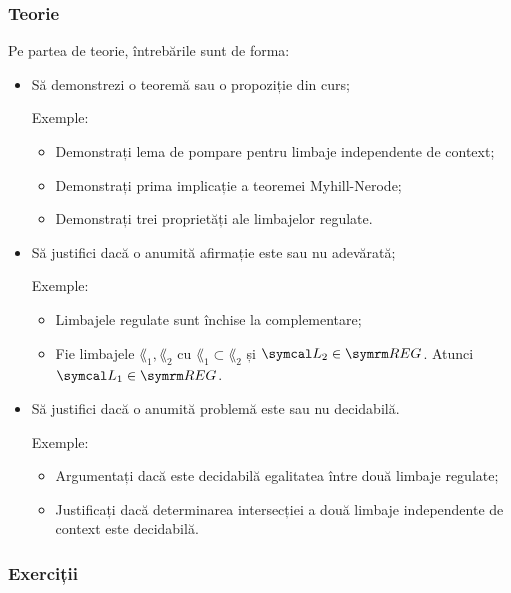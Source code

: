 \subsubsection*{Teorie}
Pe partea de teorie, întrebările sunt de forma:
\begin{itemize}
    \item Să demonstrezi o teoremă sau o propoziție din curs;

          Exemple:
          \begin{itemize}
              \item Demonstrați lema de pompare pentru limbaje independente de context;
              \item Demonstrați prima implicație a teoremei Myhill-Nerode;
              \item Demonstrați trei proprietăți ale limbajelor regulate.
          \end{itemize}

    \item Să justifici dacă o anumită afirmație este sau nu adevărată;

          Exemple:
          \begin{itemize}
              \item Limbajele regulate sunt închise la complementare;
              \item Fie limbajele \(\lang_1, \lang_2\) cu \(\lang_1 \subset \lang_2\) și \(\lang_2 \in \reglang\). Atunci \(\lang_1 \in \reglang\).
          \end{itemize}

    \item Să justifici dacă o anumită problemă este sau nu decidabilă.

          Exemple:
          \begin{itemize}
              \item Argumentați dacă este decidabilă egalitatea între două limbaje regulate;
              \item Justificați dacă determinarea intersecției a două limbaje independente de context este decidabilă.
          \end{itemize}
\end{itemize}

\subsubsection*{Exerciții}

